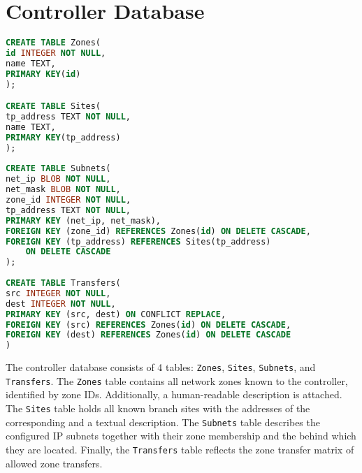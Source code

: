 \chapter{Controller Database}
\label{apdx:controllerdb}


\begin{lstlisting}[language=sql, basicstyle=\footnotesize,
]
CREATE TABLE Zones(
id INTEGER NOT NULL,
name TEXT,
PRIMARY KEY(id)
);

CREATE TABLE Sites(
tp_address TEXT NOT NULL,
name TEXT,
PRIMARY KEY(tp_address)
);
	  
CREATE TABLE Subnets(
net_ip BLOB NOT NULL,
net_mask BLOB NOT NULL,
zone_id INTEGER NOT NULL,
tp_address TEXT NOT NULL,
PRIMARY KEY (net_ip, net_mask),
FOREIGN KEY (zone_id) REFERENCES Zones(id) ON DELETE CASCADE,
FOREIGN KEY (tp_address) REFERENCES Sites(tp_address)
	ON DELETE CASCADE
);
	  
CREATE TABLE Transfers(
src INTEGER NOT NULL,
dest INTEGER NOT NULL,
PRIMARY KEY (src, dest) ON CONFLICT REPLACE,
FOREIGN KEY (src) REFERENCES Zones(id) ON DELETE CASCADE,
FOREIGN KEY (dest) REFERENCES Zones(id) ON DELETE CASCADE	
)
\end{lstlisting}

The controller database consists of 4 tables: \texttt{Zones}, \texttt{Sites}, \texttt{Subnets},
and \texttt{Transfers}. The \texttt{Zones} table contains all network zones known to the
controller, identified by zone IDs. Additionally, a human-readable description is attached. The
\texttt{Sites} table holds all known branch sites with the addresses of the corresponding \tps
and a textual description. The \texttt{Subnets} table describes the configured IP subnets
together with their zone membership and the \tp behind which they are located. Finally, the
\texttt{Transfers} table reflects the zone transfer matrix of allowed zone transfers.
